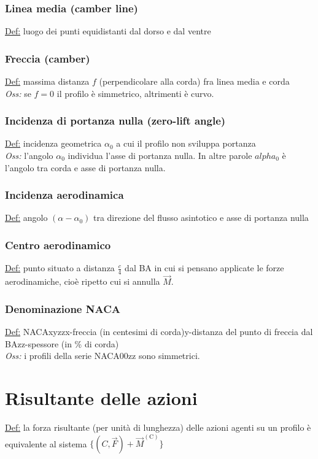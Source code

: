 \documentclass[11pt,a4paper]{report}
\begin{document}
			\subsubsection{Linea media (camber line)}
			\underline{Def:} luogo dei punti equidistanti dal dorso e dal ventre
			\subsubsection{Freccia (camber)}
			\underline{Def:} massima distanza $f$ (perpendicolare alla corda) fra linea media e corda\\
			\textit{Oss:} se $f=0$ il profilo è simmetrico, altrimenti è curvo.
			\subsubsection{Incidenza di portanza nulla (zero-lift angle)}
			\underline{Def:} incidenza geometrica $\alpha_0$ a cui il profilo non sviluppa portanza\\
			\textit{Oss:} l'angolo $\alpha_0$ individua l'asse di portanza nulla. In altre parole $alpha_0$ è l'angolo tra corda e asse di portanza nulla.
			\subsubsection{Incidenza aerodinamica}
			\underline{Def:} angolo $(\alpha-\alpha_0)$ tra direzione del flusso asintotico e asse di portanza nulla
			\subsubsection{Centro aerodinamico}
			\underline{Def:} punto situato a distanza $\frac c4$ dal BA in cui si pensano applicate le forze aerodinamiche, cioè ripetto cui si annulla $\vec M$.
		\subsubsection{Denominazione NACA}
		\underline{Def:} NACAxyzz\quad x-freccia (in centesimi di corda)\quad y-distanza del punto di freccia dal BA\quad zz-spessore (in \% di corda)\\
		\textit{Oss:} i profili della serie NACA00zz sono simmetrici.
		\section{Risultante delle azioni}
		\underline{Def:} la forza risultante (per unità di lunghezza) delle azioni agenti su un profilo è equivalente al sistema $\{(C,\vec F)+\vec M^\mathrm{(C)}\}$
\end{document}
